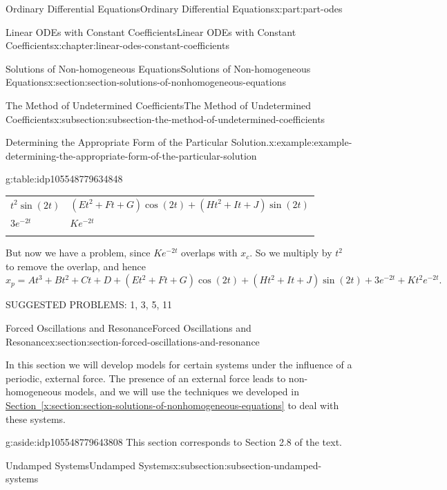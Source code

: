 \documentclass[oneside,10pt,]{book}
\newcommand{\xreffont}{\relax}
\numberwithin{equation}{part}
\newcommand{\hrulethick} {\noalign{\hrule height 0.11em}}
\begin{document}
\begin{partptx}{Ordinary Differential Equations}{}{Ordinary Differential Equations}{}{}{x:part:part-odes}
\begin{chapterptx}{Linear ODEs with Constant Coefficients}{}{Linear ODEs with Constant Coefficients}{}{}{x:chapter:linear-odes-constant-coefficients}
\begin{sectionptx}{Solutions of Non-homogeneous Equations}{}{Solutions of Non-homogeneous Equations}{}{}{x:section:section-solutions-of-nonhomogeneous-equations}
\begin{subsectionptx}{The Method of Undetermined Coefficients}{}{The Method of Undetermined Coefficients}{}{}{x:subsection:subsection-the-method-of-undetermined-coefficients}
\begin{example}{Determining the Appropriate Form of the Particular Solution.}{x:example:example-determining-the-appropriate-form-of-the-particular-solution}
\begin{tableptx}{\textbf{}}{g:table:idp105548779634848}{}
{\begin{tabular}{ll}
\(t^{2}\sin(2t)\)&\((Et^{2} + Ft + G)\cos(2t) + (Ht^{2} + It + J)\sin(2t)\)\tabularnewline\hrulethick
\(3e^{-2t}\)&\(Ke^{-2t}\)\tabularnewline\hrulethick
\end{tabular}
}%
\end{tableptx}%
 But now we have a problem, since \(Ke^{-2t}\) overlaps with \(x_{c}\). So we multiply by \(t^{2}\) to remove the overlap, and hence \(x_{p} = At^{3} + Bt^{2} + Ct + D + (Et^{2} + Ft + G)\cos(2t) + (Ht^{2} + It + J)\sin(2t) + 3e^{-2t} + Kt^{2}e^{-2t}.\)%
\end{example}
\end{subsectionptx}
\begin{conclusion}{}%
SUGGESTED PROBLEMS: 1, 3, 5, 11%
\end{conclusion}%
\end{sectionptx}
%
%
\typeout{************************************************}
\typeout{************************************************}
%
\begin{sectionptx}{Forced Oscillations and Resonance}{}{Forced Oscillations and Resonance}{}{}{x:section:section-forced-oscillations-and-resonance}
\begin{introduction}{}%
In this section we will develop models for certain systems under the influence of a periodic, external force. The presence of an external force leads to non-homogeneous models, and we will use the techniques we developed in \hyperref[x:section:section-solutions-of-nonhomogeneous-equations]{Section~{\xreffont\ref{x:section:section-solutions-of-nonhomogeneous-equations}}} to deal with these systems.%
\end{introduction}%
\begin{aside}{}{g:aside:idp105548779643808}%
This section corresponds to Section 2.8 of the text.%
\end{aside}
%
%
\typeout{************************************************}
\typeout{************************************************}
%
\begin{subsectionptx}{Undamped Systems}{}{Undamped Systems}{}{}{x:subsection:subsection-undamped-systems}

\end{subsectionptx}
\end{sectionptx}
\end{chapterptx}
\end{partptx}
\end{document}
